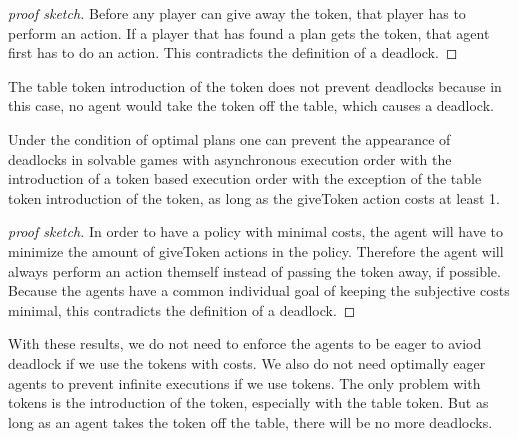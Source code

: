 \begin{proof}[proof sketch]
  Before any player can give away the token, that player has to perform an action. If a player that has found a plan gets the token, that agent first has to do an action. This contradicts the definition of a deadlock.
\end{proof}

The table token introduction of the token does not prevent deadlocks because in this case, no agent would take the token off the table, which causes a deadlock.


\begin{theorem}
  Under the condition of optimal plans one can prevent the appearance of deadlocks in solvable games with asynchronous execution order with the introduction of a token based execution order with the exception of the table token introduction of the token, as long as the giveToken action costs at least 1.
\end{theorem}

\begin{proof}[proof sketch]
  In order to have a policy with minimal costs, the agent will have to minimize the amount of giveToken actions in the policy. Therefore the agent will always perform an action themself instead of passing the token away, if possible. Because the agents have a common individual goal of keeping the subjective costs minimal, this contradicts the definition of a deadlock.
\end{proof}


With these results, we do not need to enforce the agents to be eager to aviod deadlock if we use the tokens with costs. We also do not need optimally eager agents to prevent infinite executions if we use tokens. The only problem with tokens is the introduction of the token, especially with the table token. But as long as an agent takes the token off the table, there will be no more deadlocks.
